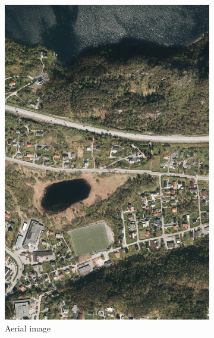 \begin{figure}
\begin{subfigure}{0.32\textwidth}
\includegraphics[width=\linewidth]{figs/datasets/Norwegian_roads_data_example.png}
\caption{Aerial image} \label{fig:norwegian_roads_example_data}
\end{subfigure}
\hspace*{\fill} %
\begin{subfigure}{0.32\textwidth}

\end{subfigure}
\end{figure}
